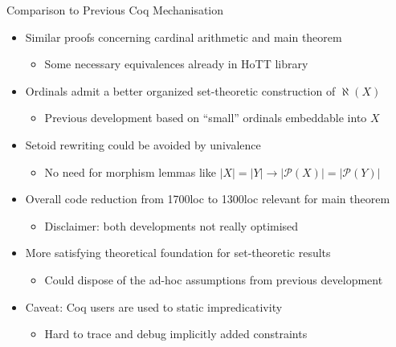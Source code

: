 \documentclass[xcolor=dvipsnames,compress,aspectratio=169,handout]{beamer}
\newcommand{\MCL}[1]{\ensuremath{\mathcal{#1}}\xspace} %
\newcommand{\Pow}{\MCL P}
\begin{document}
\begin{frame}{Comparison to Previous Coq Mechanisation}
	\pause
	\begin{itemize}
		\item
		Similar proofs concerning cardinal arithmetic and main theorem
		\begin{itemize}
			\item Some necessary equivalences already in HoTT library
		\end{itemize}
		\vspace{0.2cm}
		\pause
		\item
		Ordinals admit a better organized set-theoretic construction of $\aleph(X)$
		\begin{itemize}
			\item Previous development based on ``small'' ordinals embeddable into $X$
		\end{itemize}
		\vspace{0.2cm}
		\pause
		\item
		Setoid rewriting could be avoided by univalence
		\begin{itemize}
			\item No need for morphism lemmas like $|X|=|Y|\to |\Pow(X)|=|\Pow(Y)|$
		\end{itemize}
		\vspace{0.2cm}
		\pause
		\item
		Overall code reduction from 1700loc to 1300loc relevant for main theorem
		\begin{itemize}
			\item Disclaimer: both developments not really optimised
		\end{itemize}
		\vspace{0.2cm}
		\pause
		\item
		More satisfying theoretical foundation for set-theoretic results
		\begin{itemize}
			\item
			Could dispose of the ad-hoc assumptions from previous development
		\end{itemize}
		\vspace{0.2cm}
		\pause
		\item
		Caveat: Coq users are used to static impredicativity
		\begin{itemize}
			\item
			Hard to trace and debug implicitly added constraints
		\end{itemize}
	\end{itemize}
\end{frame}
\end{document}
